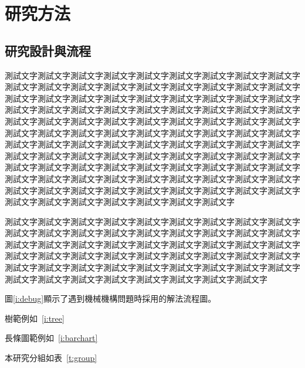 \chapter{研究方法}
\section{研究設計與流程}

測試文字測試文字測試文字測試文字測試文字測試文字測試文字測試文字測試文字測試文字測試文字測試文字測試文字測試文字測試文字測試文字測試文字測試文字測試文字測試文字測試文字測試文字測試文字測試文字測試文字測試文字測試文字測試文字測試文字測試文字測試文字測試文字測試文字測試文字測試文字測試文字測試文字測試文字測試文字測試文字測試文字測試文字測試文字測試文字測試文字測試文字測試文字測試文字測試文字測試文字測試文字測試文字測試文字測試文字測試文字測試文字測試文字測試文字測試文字測試文字測試文字測試文字測試文字測試文字測試文字測試文字測試文字測試文字測試文字測試文字測試文字測試文字測試文字測試文字測試文字測試文字測試文字測試文字測試文字測試文字測試文字測試文字測試文字測試文字測試文字測試文字測試文字測試文字測試文字測試文字測試文字測試文字測試文字測試文字測試文字測試文字測試文字測試文字測試文字測試文字測試文字測試文字測試文字測試文字測試文字測試文字

測試文字測試文字測試文字測試文字測試文字測試文字測試文字測試文字測試文字測試文字測試文字測試文字測試文字測試文字測試文字測試文字測試文字測試文字測試文字測試文字測試文字測試文字測試文字測試文字測試文字測試文字測試文字測試文字測試文字測試文字測試文字測試文字測試文字測試文字測試文字測試文字測試文字測試文字測試文字測試文字測試文字測試文字測試文字測試文字測試文字測試文字測試文字測試文字測試文字測試文字測試文字測試文字測試文字

圖\ref{i:debug}顯示了遇到機械機構問題時採用的解法流程圖。


樹範例如~\ref{i:tree}


長條圖範例如~\ref{i:barchart}


本研究分組如表~\ref{t:group}

